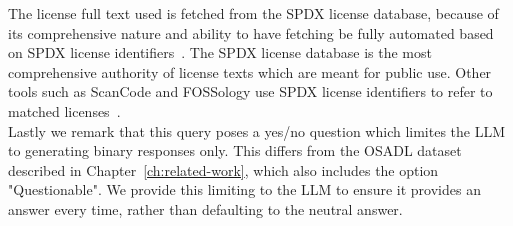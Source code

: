 The license full text used is fetched from the SPDX license database, because of its comprehensive nature and ability to have fetching be fully automated based on SPDX license identifiers~\cite{spdx-licenses}. The SPDX license database is the most comprehensive authority of license texts which are meant for public use. Other tools such as ScanCode and FOSSology use SPDX license identifiers to refer to matched licenses~\cite{scancode-home}\cite{fossology-home}. \\

Lastly we remark that this query poses a yes/no question which limites the LLM to generating binary responses only. This differs from the OSADL dataset described in Chapter~\ref{ch:related-work}, which also includes the option "Questionable". We provide this limiting to the LLM to ensure it provides an answer every time, rather than defaulting to the neutral answer.